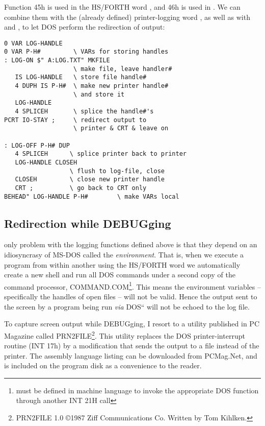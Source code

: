 Function 45h is used in the HS/FORTH word , and 46h is used in .
We can combine them with the (already defined) printer-logging word , as well as with  and , to let DOS perform the redirection of output:

\begin{lstlisting}
0 VAR LOG-HANDLE
0 VAR P-H#         \ VARs for storing handles
: LOG-ON $" A:LOG.TXT" MKFILE
                   \ make file, leave handler#
   IS LOG-HANDLE   \ store file handle#
   4 DUPH IS P-H#  \ make new printer handle#
                   \ and store it
   LOG-HANDLE
   4 SPLICEH       \ splice the handle#'s
PCRT IO-STAY ;     \ redirect output to
                   \ printer & CRT & leave on

: LOG-OFF P-H# DUP
   4 SPLICEH      \ splice printer back to printer
   LOG-HANDLE CLOSEH
                  \ flush to log-file, close
   CLOSEH         \ close new printer handle
   CRT ;          \ go back to CRT only
BEHEAD" LOG-HANDLE P-H#        \ make VARs local
\end{lstlisting}

\subsection{Redirection while DEBUGging}

 only problem with the logging functions defined above is that they depend on an idiosyncrasy of MS-DOS called the \textit{environment}.
That is, when we execute a program from within another using the HS/FORTH word  we automatically create a new shell and run all DOS commands under a second copy of the command processor, COMMAND.COM\footnote{ must be defined in machine language to invoke the appropriate DOS function through another INT 21H call}.
This means the environment variables -- specifically the handles of open files -- will not be valid.
Hence the output sent to the screen by a program being run \textit{via} DOS“ will not be echoed to the log file.

To capture screen output while DEBUGging, I resort to a utility published in PC Magazine called PRN2FILE\footnote{PRN2FILE 1.0 \copyright 1987 Ziff Communications Co. Written by Tom Kihlken.}.
This utility replaces the DOS printer-interrupt routine (INT 17h) by a modification that sends the output to a file instead of the printer.
The assembly language listing can be downloaded from PCMag.Net, and is included on the program disk as a convenience to the reader.


